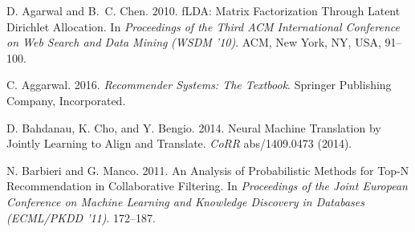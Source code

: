 \documentclass[sigconf]{acmart}
\numberwithin{equation}{section}
\begin{document}
\begin{thebibliography}{53}



\ifx \showCODEN    \undefined {}     \fi
\ifx \showDOI      \undefined \def \showDOI       #1{#1}\fi
\ifx \showISBNx    \undefined \def \showISBNx     #1{\unskip}     \fi
\ifx \showISBNxiii \undefined \def \showISBNxiii  #1{\unskip}     \fi
\ifx \showISSN     \undefined \def \showISSN      #1{\unskip}     \fi
\ifx \showLCCN     \undefined \def \showLCCN      #1{\unskip}     \fi
\ifx \shownote     \undefined \def \shownote      #1{#1}          \fi
\ifx \showarticletitle \undefined \def \showarticletitle #1{#1}   \fi
\ifx \showURL      \undefined \def \showURL       {\relax}        \fi
\providecommand\bibfield[2]{#2}
\providecommand\bibinfo[2]{#2}
\providecommand\natexlab[1]{#1}
\providecommand\showeprint[2][]{arXiv:#2}

\bibfield{author}{\bibinfo{person}{D. Agarwal} {and} \bibinfo{person}{B.~C.
  Chen}.} \bibinfo{year}{2010}\natexlab{}.
\newblock \showarticletitle{fLDA: Matrix Factorization Through Latent Dirichlet
  Allocation}. In \bibinfo{booktitle}{\emph{Proceedings of the Third ACM
  International Conference on Web Search and Data Mining}}
  \emph{(\bibinfo{series}{WSDM '10})}. \bibinfo{publisher}{ACM},
  \bibinfo{address}{New York, NY, USA}, \bibinfo{pages}{91--100}.
\newblock


\bibfield{author}{\bibinfo{person}{C. Aggarwal}.}
  \bibinfo{year}{2016}\natexlab{}.
\newblock \bibinfo{booktitle}{\emph{Recommender Systems: The Textbook}}.
\newblock \bibinfo{publisher}{Springer Publishing Company, Incorporated}.
\newblock


\bibfield{author}{\bibinfo{person}{D. Bahdanau}, \bibinfo{person}{K. Cho},
  {and} \bibinfo{person}{Y. Bengio}.} \bibinfo{year}{2014}\natexlab{}.
\newblock \showarticletitle{Neural Machine Translation by Jointly Learning to
  Align and Translate.}
\newblock \bibinfo{journal}{\emph{CoRR}}  \bibinfo{volume}{abs/1409.0473}
  (\bibinfo{year}{2014}).
\newblock


\bibfield{author}{\bibinfo{person}{N. Barbieri} {and} \bibinfo{person}{G.
  Manco}.} \bibinfo{year}{2011}\natexlab{}.
\newblock \showarticletitle{An Analysis of Probabilistic Methods for Top-N
  Recommendation in Collaborative Filtering}. In
  \bibinfo{booktitle}{\emph{Proceedings of the Joint European Conference on
  Machine Learning and Knowledge Discovery in Databases}}
  \emph{(\bibinfo{series}{ECML/PKDD '11})}. \bibinfo{pages}{172--187}.
\newblock



\end{thebibliography}
\end{document}
